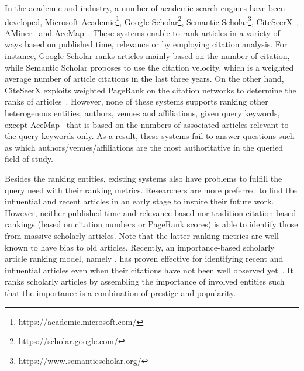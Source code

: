 In the academic and industry, a number of academic search engines have been developed, \eg Microsoft Academic\footnote{https://academic.microsoft.com/}, Google Scholar\footnote{https://scholar.google.com/}, Semantic Scholar\footnote{https://www.semanticscholar.org/}, CiteSeerX~\cite{li2006citeseerx}, AMiner~\cite{tang2008arnetminer} and AceMap~\cite{tan2016acemap}.
%
These systems enable to rank articles in a variety of  ways based on published time, relevance or by  employing citation analysis. For instance, Google Scholar ranks articles mainly based on the number of citation, while Semantic Scholar proposes to use the citation velocity, which is a weighted average number of article citations in the last three years. On the other hand, CiteSeerX exploits weighted PageRank on the citation networks to determine the ranks of articles~\cite{sun2007popularity}.
%
However, none of these systems supports ranking other heterogenous entities, \eg authors, venues and affiliations, given query keywords, except AceMap~\cite{tan2016acemap} that is based on the numbers of associated articles relevant to the query keywords only. As a result, these systems fail to answer questions such as which authors/venues/affiliations are the most authoritative in the queried field of study.


Besides the ranking entities, existing systems also have problems to fulfill the query need with their ranking metrics.
Researchers are more preferred to find the influential and recent articles in an early stage to inspire their future work.
However, neither published time and relevance based nor tradition citation-based rankings (\eg based on citation numbers or PageRank scores) is able to identify those from massive scholarly articles. Note that the latter ranking metrics are well known to have bias to old articles.
%
Recently, an importance-based scholarly article ranking model, namely \sarank, has proven effective for identifying recent and influential articles even when their citations have not been well observed yet~\cite{ma2018query}. It ranks scholarly articles by assembling the importance of involved entities such that the importance is a combination of prestige and popularity. %






